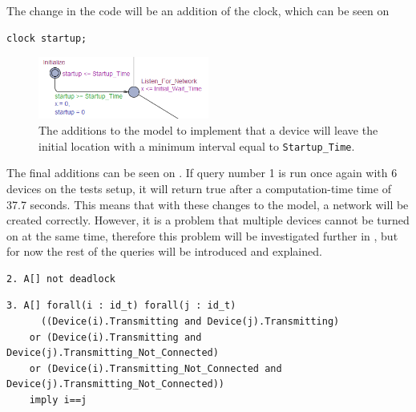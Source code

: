 The change in the code will be an addition of the clock, which can be seen on 
\begin{lstlisting}[style=UPPAAL, caption={Addition of the \texttt{startup} clock}, label={lst:Clock_Addition}]
clock startup;
\end{lstlisting}

\begin{figure}
    \hspace{-10pt}
    \vspace{-10pt}
  \includegraphics[width=0.5\textwidth]{Figures/Model/IntervalStartup.png} 
\caption{The additions to the model to implement that a device will leave the initial location with a minimum interval equal to \texttt{Startup\_Time}.}
\label{fig:OneStartUp}
\end{figure}

The final additions can be seen on .
If query number 1 is run once again with 6 devices on the tests setup, it will return true after a computation-time time of 37.7 seconds.
This means that with these changes to the model, a network will be created correctly.
However, it is a problem that multiple devices cannot be turned on at the same time, therefore this problem will be investigated further in , but for now the rest of the queries will be introduced and explained.

\begin{lstlisting}[style=UPPAAL, title={The query requires that there is no deadlock in the system, it will result in true with a computation-time of 84.8 seconds when run on the test setup with 6 devices.}]
2. A[] not deadlock
\end{lstlisting}

\begin{lstlisting}[style=UPPAAL, title={This query requires that no pair of devices are in the \enquote*{Transmitting} state at the same time. The query will, when run with 6 devices on the test setup, result in true with a computation-time of 67.7 seconds.}]
3. A[] forall(i : id_t) forall(j : id_t) 
      ((Device(i).Transmitting and Device(j).Transmitting) 
    or (Device(i).Transmitting and Device(j).Transmitting_Not_Connected) 
    or (Device(i).Transmitting_Not_Connected and Device(j).Transmitting_Not_Connected)) 
    imply i==j
\end{lstlisting}

